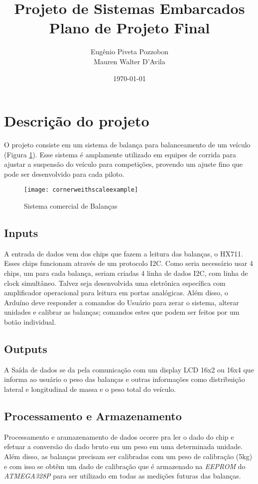 \documentclass[a4paper, 12pt]{article}
\title{Projeto de Sistemas Embarcados\\Plano de Projeto Final}
\author{Eugênio Piveta Pozzobon\\Mauren Walter D'Avila}
\date{\today}
\begin{document}
	\maketitle
	\newpage
	
	\section{Descrição do projeto}
	
	O projeto consiste em um sistema de balança para balanceamento de um veículo (Figura \ref{fig:cornerweithscaleexample}). Esse sistema é amplamente utilizado em equipes de corrida para ajustar a suspensão do veículo para competições, provendo um ajuste fino que pode ser desenvolvido para cada piloto. 
	
	\begin{figure}[!htb]
	\centering
		\texttt{[image: 
			cornerweithscaleexample]}
		\caption{Sistema comercial de Balanças}
		\label{fig:cornerweithscaleexample}
	\end{figure}
	
	\subsection{Inputs}
	A entrada de dados vem dos chips que fazem a leitura das balanças, o HX711. Esses chips funcionam através de um protocolo I2C. Como seria necessário usar 4 chips, um para cada balança, seriam criadas 4 linha de dados I2C, com linha de clock simultâneo. Talvez seja desenvolvida uma eletrônica específica com amplificador operacional para leitura em portas analógicas. Além disso, o Arduíno deve responder a comandos do Usuário para zerar o sistema, alterar unidades e calibrar as balanças; comandos estes que podem ser feitos por um botão individual.
	
	
	\subsection{Outputs}
	A Saída de dados se da pela comunicação com um display LCD 16x2 ou 16x4 que informa ao usuário o peso das balanças e outras informações como distribuição lateral e longitudinal de massa e o peso total do veículo. 
	
	
	\subsection{Processamento e Armazenamento}
	Processamento e aramazenamento de dados ocorre pra ler o dado do chip e efetuar a conversão do dado bruto em um peso em uma determinada unidade. Além disso, as balanças precisam ser calibradas com um peso de calibração (5kg) e com isso se obtêm um dado de calibração que é armazenado na \textit{EEPROM} do \textit{ATMEGA328P} para ser utilizado em todas as medições futuras das balanças. 
	
\end{document}
